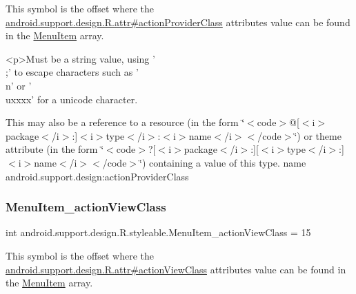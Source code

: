 This symbol is the offset where the \hyperlink{classandroid_1_1support_1_1design_1_1R_1_1attr_af8e913202203f0fa6bb2fd297472c507}{android.\+support.\+design.\+R.\+attr\#action\+Provider\+Class} attribute\textquotesingle{}s value can be found in the \hyperlink{classandroid_1_1support_1_1design_1_1R_1_1styleable_a4c90afdbb461f2bfba191da26fbc881c}{Menu\+Item} array.

\begin{DoxyVerb}      <p>Must be a string value, using '\\;' to escape characters such as '\\n' or '\\uxxxx' for a unicode character.
\end{DoxyVerb}
 

This may also be a reference to a resource (in the form \char`\"{}$<$code$>$@\mbox{[}$<$i$>$package$<$/i$>$\+:\mbox{]}$<$i$>$type$<$/i$>$\+:$<$i$>$name$<$/i$>$$<$/code$>$\char`\"{}) or theme attribute (in the form \char`\"{}$<$code$>$?\mbox{[}$<$i$>$package$<$/i$>$\+:\mbox{]}\mbox{[}$<$i$>$type$<$/i$>$\+:\mbox{]}$<$i$>$name$<$/i$>$$<$/code$>$\char`\"{}) containing a value of this type.  name android.\+support.\+design\+:action\+Provider\+Class \mbox{\label{classandroid_1_1support_1_1design_1_1R_1_1styleable_a0cb751f455c5645ceca6fe5635e01f69}} 
\subsubsection{\texorpdfstring{Menu\+Item\+\_\+action\+View\+Class}{MenuItem\_actionViewClass}}
{\footnotesize\ttfamily int android.\+support.\+design.\+R.\+styleable.\+Menu\+Item\+\_\+action\+View\+Class = 15\hspace{0.3cm}{\ttfamily [static]}}

This symbol is the offset where the \hyperlink{classandroid_1_1support_1_1design_1_1R_1_1attr_ac560c622d91c1f3125e880765842e01a}{android.\+support.\+design.\+R.\+attr\#action\+View\+Class} attribute\textquotesingle{}s value can be found in the \hyperlink{classandroid_1_1support_1_1design_1_1R_1_1styleable_a4c90afdbb461f2bfba191da26fbc881c}{Menu\+Item} array.

